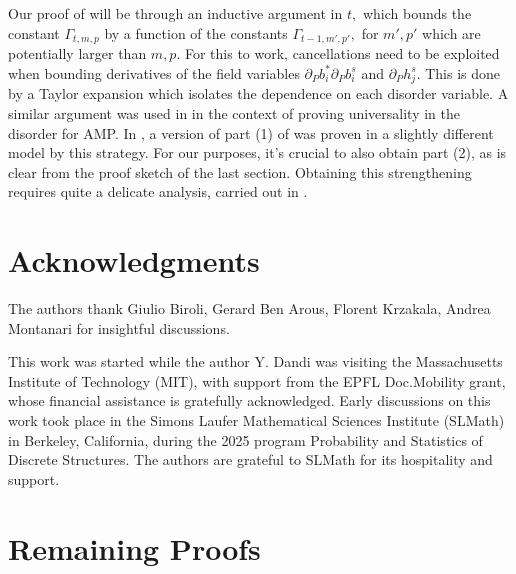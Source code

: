 \documentclass{article}
\newcommand{\1}{\mathbbm{1}}
\theoremstyle{plain}
\theoremstyle{definition}
\theoremstyle{remark}
\begin{document}
Our proof of  will be through an inductive argument in $t,$ which bounds the constant $\Gamma_{t,m,p}$ by a function of the constants $\Gamma_{t-1,m',p'},$ for $m',p'$ which are potentially larger than $m,p$. For this to work, cancellations need to be exploited when bounding derivatives of the field variables $\partial_P b^*_i\partial_P b^s_i$ and $\partial_P h_j^s$. This is done by a Taylor expansion which isolates the dependence on each disorder variable. A similar argument was used in \cite{wei-kwo-universality} in the context of proving universality in the disorder for AMP. In \cite{wei-kwo-universality}, a version of part (1) of  was proven in a slightly different model by this strategy. For our purposes, it's crucial to also obtain part (2), as is clear from the proof sketch of the last section. Obtaining this strengthening requires quite a delicate analysis, carried out in .




\section*{Acknowledgments}
The authors thank Giulio Biroli, Gerard Ben Arous, Florent Krzakala, Andrea Montanari for insightful discussions.

This work was started while the author Y. Dandi was visiting the Massachusetts Institute of Technology (MIT), with support from the EPFL Doc.Mobility grant, whose financial assistance is gratefully acknowledged. Early discussions on this work took place in the Simons Laufer Mathematical Sciences Institute (SLMath) in Berkeley, California, during the 2025 program Probability and Statistics of Discrete Structures. The authors are grateful to SLMath for its hospitality and support.



\printbibliography

\appendix
\section{Remaining Proofs}
\end{document}
